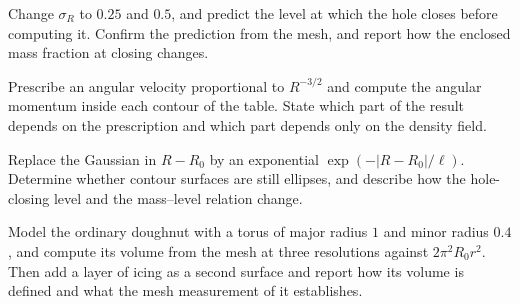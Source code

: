 \begin{exercise}
Change $\sigma_R$ to $0.25$ and $0.5$, and predict the level at which the hole closes before computing it. Confirm the prediction from the mesh, and report how the enclosed mass fraction at closing changes.
\end{exercise}

\begin{exercise}
Prescribe an angular velocity proportional to $R^{-3/2}$ and compute the angular momentum inside each contour of the table. State which part of the result depends on the prescription and which part depends only on the density field.
\end{exercise}

\begin{exercise}
Replace the Gaussian in $R-R_0$ by an exponential $\exp(-|R-R_0|/\ell)$. Determine whether contour surfaces are still ellipses, and describe how the hole-closing level and the mass--level relation change.
\end{exercise}

\begin{exercise}
Model the ordinary doughnut with a torus of major radius $1$ and minor radius $0.4$, and compute its volume from the mesh at three resolutions against $2\pi^2R_0r^2$. Then add a layer of icing as a second surface and report how its volume is defined and what the mesh measurement of it establishes.
\end{exercise}
